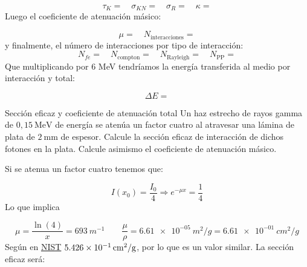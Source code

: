 \begin{equation}
    \tau_K =        \quad 
    \sigma_{KN} =   \quad 
    \sigma_R =      \quad 
    \kappa =  
\end{equation}
Luego el coeficiente de atenuación másico: 

\begin{equation}
    \mu=            \quad 
    N_{\text{interacciones}} = 
\end{equation}
y finalmente, el número de interacciones por tipo de interacción: 
\begin{equation}
    N_{fe} = \quad 
    N_{\text{compton}} = \quad 
    N_{\text{Rayleigh}} = \quad 
    N_{\text{PP}} =  
\end{equation}
Que multiplicando por $6$ MeV tendríamos la energía transferida al medio por interacción y total: 

\begin{equation}
    \Delta E= 
\end{equation}



\begin{Ejercicio}{Sección eficaz y coeficiente de atenuación total} 
    Un haz estrecho de rayos gamma de $0,15\ \text{MeV}$ de energía se atenúa un factor cuatro al atravesar una lámina de plata de $2\ \text{mm}$ de espesor. Calcule la sección eficaz de interacción de dichos fotones en la plata. Calcule asimismo el coeficiente de atenuación másico.
\end{Ejercicio}

Si se atenua un factor cuatro tenemos que: 

\begin{equation}
    I(x_0) = \frac{I_0}{4} \Rightarrow e^{-\mu x} = \frac{1}{4}
\end{equation}
Lo que implica 

\begin{equation}
    \mu = \frac{\ln (4)}{x} = 693\ \unit{m^{-1}} \qquad \frac{\mu}{\rho} = \SI{6.61e-05}{m^2/g} = \SI{6.61e-01}{cm^2/g}
\end{equation}
Según en \href{https://physics.nist.gov/cgi-bin/Xcom/xcom3_1}{NIST} $\SI{5.426E-01}{cm^2/g}$, por lo que es un valor similar. La sección eficaz será: 

